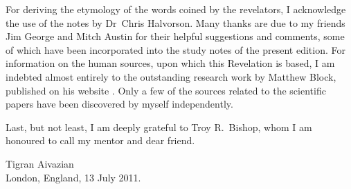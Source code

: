 \begin{center}
\end{center}

For deriving the etymology of the words coined by the revelators, I acknowledge the use of the notes by Dr~Chris Halvorson.
Many thanks are due to my friends Jim George and Mitch Austin for their helpful suggestions and comments,
some of which have been incorporated into the study notes of the present edition.
For information on the human sources, upon which this Revelation is based, I am indebted almost entirely to the outstanding
research work by Matthew Block, published on his website .
Only a few of the sources related to the scientific papers have been discovered by myself independently.

Last, but not least, I am deeply grateful to Troy R.~Bishop, whom I am honoured to call my mentor and dear friend.


\textcolor{ubdarkblue}{%
\authorfont
{}
\selectfont
\begin{flushleft}
Tigran Aivazian\\
London, England, 13 July 2011.\\
\end{flushleft}
}
